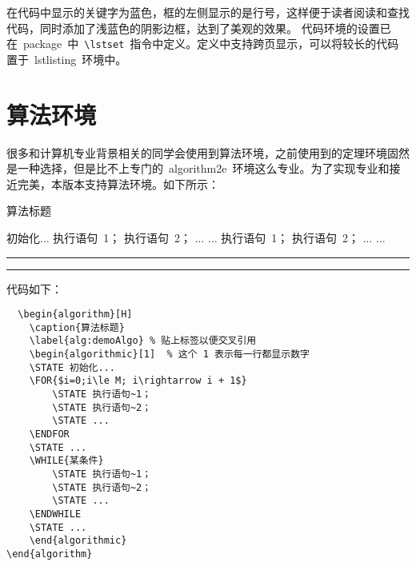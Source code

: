 在代码中显示的关键字为蓝色，框的左侧显示的是行号，这样便于读者阅读和查找代码，同时添加了浅蓝色的阴影边框，达到了美观的效果。
代码环境的设置已在~package~中~\verb|\lstset|~指令中定义。定义中支持跨页显示，可以将较长的代码置于~lstlisting~环境中。
\section{算法环境}
很多和计算机专业背景相关的同学会使用到算法环境，之前使用到的定理环境固然是一种选择，但是比不上专门的~algorithm2e~环境这么专业。为了实现专业和接近完美，本版本支持算法环境。如下所示：

\begin{algorithm}[H]
    \caption{算法标题}
    \label{alg:demoAlgo} %
    \begin{algorithmic}[1]  %
    \STATE 初始化...
        \STATE 执行语句~1；
        \STATE 执行语句~2；
        \STATE ...
    \ENDFOR
    \STATE ...
        \STATE 执行语句~1；
        \STATE 执行语句~2；
        \STATE ...
    \ENDWHILE
    \STATE ...
    \end{algorithmic}
\end{algorithm}
\noindent\hrule
\vspace{0.1em}\noindent\hrule

\vspace{1em}

\noindent 代码如下：
\lstset{language=tex,tabsize=4}
\begin{lstlisting}
  \begin{algorithm}[H]
    \caption{算法标题}
    \label{alg:demoAlgo} % 贴上标签以便交叉引用
    \begin{algorithmic}[1]  % 这个 1 表示每一行都显示数字
    \STATE 初始化...
    \FOR{$i=0;i\le M; i\rightarrow i + 1$}
        \STATE 执行语句~1；
        \STATE 执行语句~2；
        \STATE ...
    \ENDFOR
    \STATE ...
    \WHILE{某条件}
        \STATE 执行语句~1；
        \STATE 执行语句~2；
        \STATE ...
    \ENDWHILE
    \STATE ...
    \end{algorithmic}
\end{algorithm}
\end{lstlisting}

